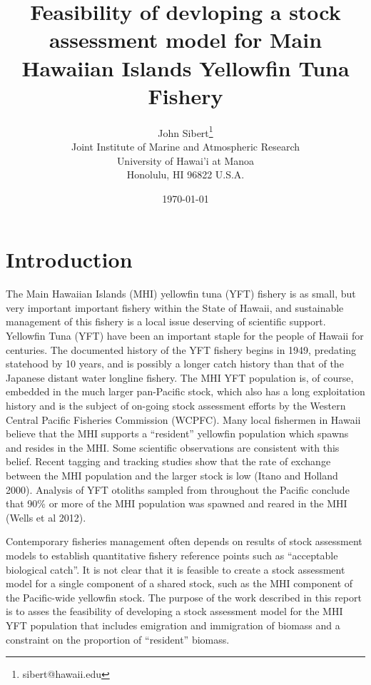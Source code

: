 \documentclass[12pt,letterpaper,twoside]{article}
\title{Feasibility of devloping a stock assessment model for Main Hawaiian Islands Yellowfin Tuna
Fishery}
\author{
John Sibert\thanks{sibert@hawaii.edu}\\
Joint Institute of Marine and Atmospheric Research\\
University of Hawai'i at Manoa\\
Honolulu, HI  96822 U.S.A.\\[0.125in]
\date{\today}
}
\newcommand\doublespacing{\baselineskip=1.6\normalbaselineskip}
\newcommand\help[1]{\color{Magenta}{\it #1 }\normalcolor}
\begin{document}
\maketitle

\doublespacing

\begin{abstract}
\help{Write Me}
\end{abstract}

\section{Introduction}
The Main Hawaiian Islands (MHI) yellowfin tuna (YFT) fishery is 
as small, but very important important fishery within the State of
Hawaii, and sustainable management of this
fishery is a local issue deserving of scientific support.
Yellowfin Tuna (YFT) have been an important staple for the people of
Hawaii for centuries. The documented history of the YFT fishery begins in
1949, predating statehood by 10 years, and is possibly a longer catch
history than that of the Japanese distant water longline fishery.
The MHI YFT population is, of course,
embedded in the much larger pan-Pacific stock, which also has a long
exploitation history and is the subject of on-going stock assessment
efforts by the Western Central Pacific Fisheries Commission (WCPFC).
Many local fishermen in Hawaii
believe that the MHI supports a ``resident'' yellowfin population
which spawns and resides in the MHI.
Some scientific observations are consistent with this belief. 
Recent tagging and tracking
studies show that the rate of exchange between the MHI population
and the larger stock is low (Itano and Holland 2000). 
Analysis of YFT otoliths sampled from
throughout the Pacific conclude that 90\% or more of the MHI
population was spawned and reared in the MHI (Wells et al 2012).

Contemporary fisheries management often depends on results of stock
assessment models to establish quantitative fishery reference points
such as ``acceptable biological catch''.
It is not clear that it is feasible to create a stock assessment model
for a single component of a shared stock, such as the MHI component of
the Pacific-wide yellowfin stock.
The purpose of the work described in this report is to asses the
feasibility of developing a stock assessment model for the MHI YFT
population that includes emigration and immigration of biomass and a
constraint on the proportion of ``resident'' biomass.
\end{document}
